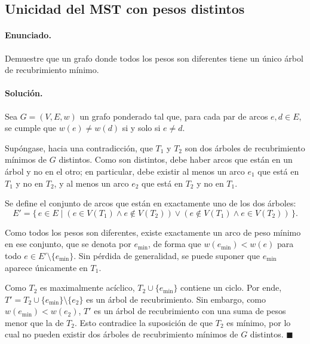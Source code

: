 
\subsection*{Unicidad del MST con pesos distintos}

\paragraph{Enunciado.}
Demuestre que un grafo donde todos los pesos son diferentes tiene un único árbol de recubrimiento mínimo.

\paragraph{Solución.}
Sea $G = (V, E, w)$ un grafo ponderado tal que, para cada par de arcos $e, d \in E$, se cumple que $w(e) \neq w(d)$ si y solo si $e \neq d$.

Supóngase, hacia una contradicción, que $T_1$ y $T_2$ son dos árboles de recubrimiento mínimos de $G$ distintos. Como son distintos, debe haber arcos que están en un árbol y no en el otro; en particular, debe existir al menos un arco $e_1$ que está en $T_1$ y no en $T_2$, y al menos un arco $e_2$ que está en $T_2$ y no en $T_1$.

Se define el conjunto de arcos que están en exactamente uno de los dos árboles:
\[
  E' = \{\, e \in E \mid (e \in V(T_1) \land e \notin V(T_2)) \lor (e \notin V(T_1) \land e \in V(T_2)) \,\}.
\]

Como todos los pesos son diferentes, existe exactamente un arco de peso mínimo en ese conjunto, que se denota por $e_{\min}$, de forma que $w(e_{\min}) < w(e)$ para todo $e \in E' \setminus \{e_{\min}\}$. Sin pérdida de generalidad, se puede suponer que $e_{\min}$ aparece únicamente en $T_1$.

Como $T_2$ es maximalmente acíclico, $T_2 \cup \{e_{\min}\}$ contiene un ciclo. Por ende, $T' = T_2 \cup \{e_{\min}\} \setminus \{e_2\}$ es un árbol de recubrimiento. Sin embargo, como $w(e_{\min}) < w(e_2)$, $T'$ es un árbol de recubrimiento con una suma de pesos menor que la de $T_2$. Esto contradice la suposición de que $T_2$ es mínimo, por lo cual no pueden existir dos árboles de recubrimiento mínimos de $G$ distintos. \hfill$\blacksquare$
